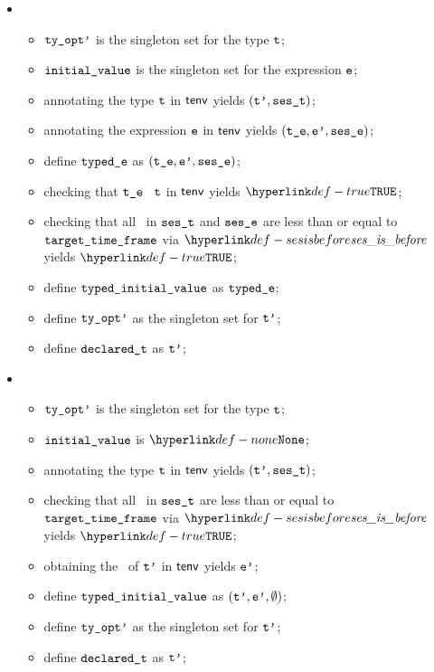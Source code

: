 \ProseParagraph
\OneApplies
\begin{itemize}
  \item {}
  \begin{itemize}
    \item $\texttt{ty\_opt'}$ is the singleton set for the type $\texttt{t}$;
    \item $\texttt{initial\_value}$ is the singleton set for the expression $\texttt{e}$;
    \item annotating the type $\texttt{t}$ in $\textsf{tenv}$ yields $(\texttt{t'}, \texttt{ses\_t})$\ProseOrTypeError;
    \item annotating the expression $\texttt{e}$ in $\textsf{tenv}$ yields $(\texttt{t\_e}, \texttt{e'}, \texttt{ses\_e})$\ProseOrTypeError;
    \item define $\texttt{typed\_e}$ as $(\texttt{t\_e}, \texttt{e'}, \texttt{ses\_e})$;
    \item checking that $\texttt{t\_e}$ \typesatisfies\ $\texttt{t}$ in $\textsf{tenv}$ yields $\True$\ProseOrTypeError;
    \item checking that all \timeframesterm\ in $\texttt{ses\_t}$ and $\texttt{ses\_e}$ are less than or equal to \\
          $\texttt{target\_time\_frame}$ via $\sesisbefore$ yields $\True$\ProseOrTypeError;
    \item define $\texttt{typed\_initial\_value}$ as $\texttt{typed\_e}$;
    \item define $\texttt{ty\_opt'}$ as the singleton set for $\texttt{t'}$;
    \item define $\texttt{declared\_t}$ as $\texttt{t'}$;
  \end{itemize}

  \item {}
  \begin{itemize}
    \item $\texttt{ty\_opt'}$ is the singleton set for the type $\texttt{t}$;
    \item $\texttt{initial\_value}$ is $\None$;
    \item annotating the type $\texttt{t}$ in $\textsf{tenv}$ yields $(\texttt{t'}, \texttt{ses\_t})$\ProseOrTypeError;
    \item checking that all \timeframesterm\ in $\texttt{ses\_t}$ are less than or equal to \\
          $\texttt{target\_time\_frame}$ via $\sesisbefore$ yields $\True$\ProseOrTypeError;
    \item obtaining the \basevalueterm\ of $\texttt{t'}$ in $\textsf{tenv}$ yields $\texttt{e'}$\ProseOrTypeError;
    \item define $\texttt{typed\_initial\_value}$ as $(\texttt{t'}, \texttt{e'}, \emptyset)$;
    \item define $\texttt{ty\_opt'}$ as the singleton set for $\texttt{t'}$;
    \item define $\texttt{declared\_t}$ as $\texttt{t'}$;
  \end{itemize}


\end{itemize}
